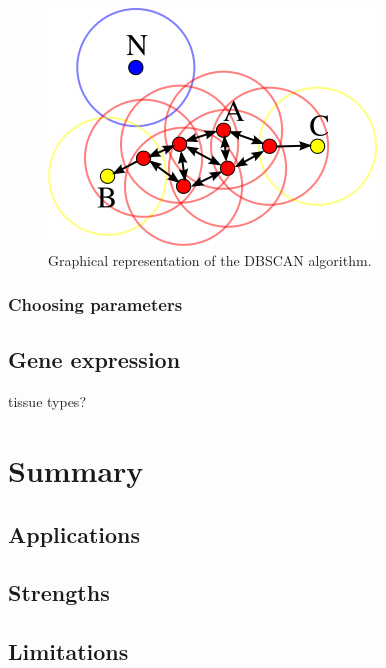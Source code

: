 \documentclass[]{book}
\theoremstyle{definition}
\theoremstyle{definition}
\theoremstyle{definition}
\theoremstyle{remark}
\begin{document}
\begin{figure}

{\centering \includegraphics[width=0.75\linewidth]{figures/DBSCAN-Illustration} 

}

\caption{Graphical representation of the DBSCAN algorithm.}\label{fig:DBSCAN-illustration}
\end{figure}

\subsubsection{Choosing parameters}\label{choosing-parameters}

\subsection{Gene expression}\label{gene-expression}

tissue types?

\section{Summary}\label{summary}

\subsection{Applications}\label{applications}

\subsection{Strengths}\label{strengths}

\subsection{Limitations}\label{limitations}
\end{document}
